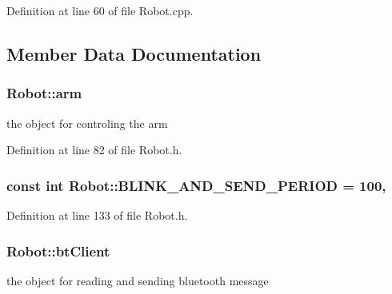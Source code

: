 Definition at line 60 of file Robot.\-cpp.



\subsection{Member Data Documentation}
\hypertarget{classRobot_a444673862cbe384992aceb066282b500}{
\subsubsection[{arm}]{ Robot\-::arm}}\label{classRobot_a444673862cbe384992aceb066282b500}


the object for controling the arm 



Definition at line 82 of file Robot.\-h.

\hypertarget{classRobot_ad0f5c1ce14363f3c05232eceab37ceff}{
\subsubsection[{B\-L\-I\-N\-K\-\_\-\-A\-N\-D\-\_\-\-S\-E\-N\-D\-\_\-\-P\-E\-R\-I\-O\-D}]{\setlength{\rightskip}{0pt plus 5cm}const int Robot\-::\-B\-L\-I\-N\-K\-\_\-\-A\-N\-D\-\_\-\-S\-E\-N\-D\-\_\-\-P\-E\-R\-I\-O\-D = 100\hspace{0.3cm}{\ttfamily [static]}, {\ttfamily [private]}}}\label{classRobot_ad0f5c1ce14363f3c05232eceab37ceff}


Definition at line 133 of file Robot.\-h.

\hypertarget{classRobot_a9da91e6d551ed02038e935b3c755cc75}{
\subsubsection[{bt\-Client}]{ Robot\-::bt\-Client}}\label{classRobot_a9da91e6d551ed02038e935b3c755cc75}


the object for reading and sending bluetooth message 



